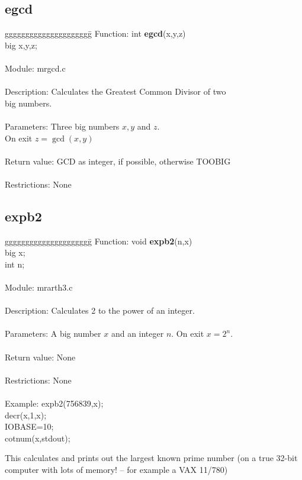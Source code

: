 \subsection{egcd}

\begin{tabbing}
ggggggggggggggggggggg\= \kill
  Function:      \>int {\bf egcd}(x,y,z) \\
                     \>big x,y,z; \\
      \ \\
      Module:        \>mrgcd.c \\
      \ \\
      Description:   \>Calculates the Greatest Common Divisor of two  \\
                     \>big numbers. \\
      \ \\
      Parameters:    \>Three big numbers $x, y$ and $z$. \\
                     \>On exit $z=\gcd(x,y)$ \\
      \ \\
      Return value:  \>GCD as integer, if possible, otherwise TOOBIG \\
      \ \\
      Restrictions:  \>None \\
\end{tabbing}
\pagebreak
\subsection{expb2}
\begin{tabbing}
ggggggggggggggggggggg\= \kill
      Function:      \>void {\bf expb2}(n,x) \\
                     \>big x;    \\
                     \>int n;    \\
      \ \\
      Module:        \>mrarth3.c    \\
      \ \\
      Description:   \>Calculates 2 to the power of an integer. \\
      \ \\
      Parameters:    \>A big number $x$ and an integer $n$. On exit $x=2^{n}$. \\     
      \ \\
      Return value:  \>None \\
      \ \\
      Restrictions:  \>None   \\
      \ \\
      Example:       \>expb2(756839,x); \\
                     \>decr(x,1,x); \\
                     \>IOBASE=10; \\
                     \>cotnum(x,stdout); \\
                     \>
                     \parbox[t]{3in}
                     {This calculates and prints out the largest known prime 
                     number (on a true 32-bit computer with lots of memory!
                     -- for example a VAX 11/780)}
\end{tabbing}
\pagebreak
